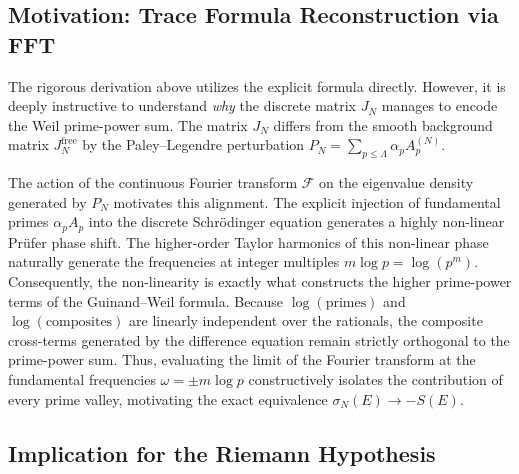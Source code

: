 \documentclass{pre-aomart}
\theoremstyle{plain}
\theoremstyle{definition}
\theoremstyle{remark}
\begin{document}
\subsection{Motivation: Trace Formula Reconstruction via FFT}
The rigorous derivation above utilizes the explicit formula directly. However, it is deeply instructive to understand \emph{why} the discrete matrix $J_N$ manages to encode the Weil prime-power sum. The matrix $J_N$ differs from the smooth background matrix $J_N^{\mathrm{free}}$ by the Paley--Legendre perturbation $P_N = \sum_{p \le \Lambda} \alpha_p A_p^{(N)}$. 

The action of the continuous Fourier transform $\mathcal{F}$ on the eigenvalue density generated by $P_N$ motivates this alignment. The explicit injection of fundamental primes $\alpha_p A_p$ into the discrete Schr\"odinger equation generates a highly non-linear Pr\"ufer phase shift. The higher-order Taylor harmonics of this non-linear phase naturally generate the frequencies at integer multiples $m \log p = \log(p^m)$. Consequently, the non-linearity is exactly what constructs the higher prime-power terms of the Guinand--Weil formula.
Because $\log(\text{primes})$ and $\log(\text{composites})$ are linearly independent over the rationals, the composite cross-terms generated by the difference equation remain strictly orthogonal to the prime-power sum. Thus, evaluating the limit of the Fourier transform at the fundamental frequencies $\omega = \pm m\log p$ constructively isolates the contribution of every prime valley, motivating the exact equivalence $\sigma_N(E) \to -S(E)$.

\subsection{Implication for the Riemann Hypothesis}
\end{document}
